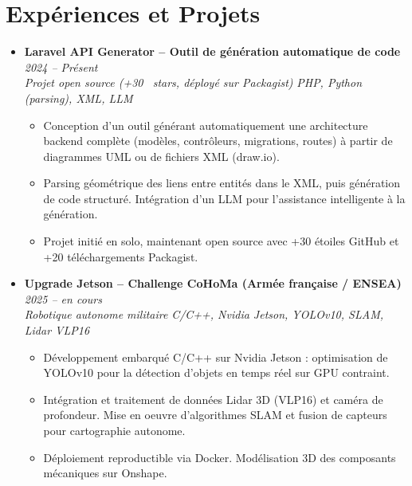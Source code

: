 \documentclass[a4paper,11pt]{article}
\begin{document}
\section{Expériences et Projets}
\begin{itemize}[leftmargin=*, label={-}]

\item \textbf{Laravel API Generator -- Outil de génération automatique de code} \hfill \textit{2024 -- Présent} \\
\textit{Projet open source (+30 \faGithub\ stars, déployé sur Packagist)} \hfill \textit{PHP, Python (parsing), XML, LLM}
\vspace{-2pt}
\begin{itemize}[leftmargin=0.4cm, nosep, label=\tiny$\bullet$]
    \item \small{Conception d'un outil générant automatiquement une architecture backend complète (modèles, contrôleurs, migrations, routes) à partir de diagrammes UML ou de fichiers XML (draw.io).}
    \item \small{Parsing géométrique des liens entre entités dans le XML, puis génération de code structuré. Intégration d'un LLM pour l'assistance intelligente à la génération.}
    \item \small{Projet initié en solo, maintenant open source avec +30 étoiles GitHub et +20 téléchargements Packagist.}
\end{itemize}
\vspace{3pt}

\item \textbf{Upgrade Jetson -- Challenge CoHoMa (Armée française / ENSEA)} \hfill \textit{2025 -- en cours} \\
\textit{Robotique autonome militaire} \hfill \textit{C/C++, Nvidia Jetson, YOLOv10, SLAM, Lidar VLP16}
\vspace{-2pt}
\begin{itemize}[leftmargin=0.4cm, nosep, label=\tiny$\bullet$]
    \item \small{Développement embarqué C/C++ sur Nvidia Jetson : optimisation de YOLOv10 pour la détection d'objets en temps réel sur GPU contraint.}
    \item \small{Intégration et traitement de données Lidar 3D (VLP16) et caméra de profondeur. Mise en oeuvre d'algorithmes SLAM et fusion de capteurs pour cartographie autonome.}
    \item \small{Déploiement reproductible via Docker. Modélisation 3D des composants mécaniques sur Onshape.}
\end{itemize}
\vspace{3pt}


\end{itemize}
\end{document}
